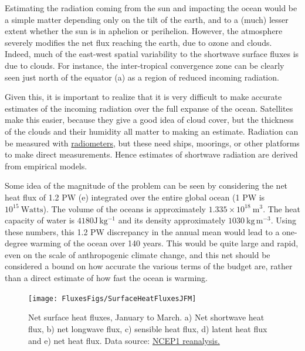 Estimating the radiation coming from the sun and impacting the ocean would be a simple matter depending only on the tilt of the earth, and to a (much) lesser extent whether the sun is in aphelion or perihelion.  However, the atmosphere severely modifies the net flux reaching the earth, due to ozone and clouds.  Indeed, much of the east-west spatial variability to the shortwave surface fluxes is due to clouds. For instance, the inter-tropical convergence zone can be clearly seen just north of the equator (a) as a region of reduced incoming radiation.  


Given this, it is important to realize that it is very difficult to make accurate estimates of the incoming radiation over the full expanse of the ocean.  Satellites make this easier, because they give a good idea of cloud cover, but the thickness of the clouds and their humidity all matter to making an estimate.  Radiation can be measured with \href{https://en.wikipedia.org/wiki/Radiometer}{radiometers}, but these need ships, moorings, or other platforms to make direct measurements. Hence estimates of shortwave radiation are derived from empirical models.  

Some idea of the magnitude of the problem can be seen by considering the net heat flux of 1.2 PW (e) integrated over the entire global ocean (1 PW is $10^{15}\ \mathrm{Watts}$). The volume of the oceans is approximately $1.335\times10^{18}\ \mathrm{m^3}$. The heat capacity of water is $4180 \mathrm{J\, kg^{-1}}$ and its density approximately $1030 \ \mathrm{kg\,m^{-3}}$.  Using these numbers, this 1.2 PW discrepancy in the annual mean would lead to a one-degree warming of the ocean over 140 years.  This would be quite large and rapid, even on the scale of anthropogenic climate change, and this net should be considered a bound on how accurate the various terms of the budget are, rather than a direct estimate of how fast the ocean is warming.  

\begin{figure}[htb]
  \centering
  \texttt{[image: FluxesFigs/SurfaceHeatFluxesJFM]}
  \caption{Net surface heat fluxes, January to March.  a) Net shortwave heat flux, b) net longwave flux, c) sensible heat flux, d) latent heat flux and e) net heat flux. 
  Data source:  \href{https://psl.noaa.gov/data/gridded/data.ncep.reanalysis.derived.surfaceflux.html}{NCEP1 reanalysis.}  }
  \label{fig:SurfaceHeatFluxesJFM}
\end{figure}

